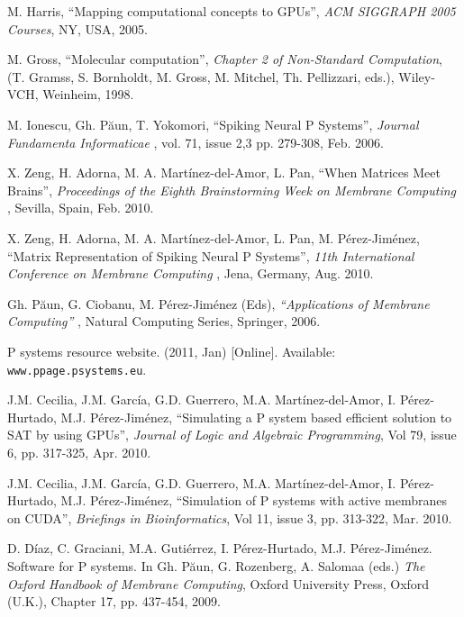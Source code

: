 \documentclass{svmultm}
\begin{document}
\begin{thebibliography}{9999}



 M. Harris, ``Mapping computational concepts to GPUs'', {\it ACM SIGGRAPH 2005 Courses}, NY, USA, 2005.

 M. Gross,  ``Molecular computation'', {\it Chapter 2 of Non-Standard Computation}, (T. Gramss,
S. Bornholdt, M. Gross, M. Mitchel, Th. Pellizzari, eds.), Wiley-VCH, Weinheim, 1998.


 M. Ionescu, Gh. P\u aun, T. Yokomori, ``Spiking Neural P Systems'', {\it Journal Fundamenta Informaticae  }, vol. 71, issue 2,3 pp. 279-308, Feb. 2006.


 X. Zeng, H. Adorna, M. A. Mart\'{i}nez-del-Amor, L. Pan, ``When Matrices Meet Brains'', {\it Proceedings of the Eighth Brainstorming Week on Membrane Computing }, Sevilla, Spain, Feb. 2010.

 X. Zeng, H. Adorna, M. A. Mart\'{i}nez-del-Amor, L. Pan, M. P\'{e}rez-Jim\'{e}nez, ``Matrix Representation of Spiking Neural P Systems'', {\it 11th International Conference on Membrane Computing }, Jena, Germany, Aug. 2010.


 Gh. P\u aun, G. Ciobanu, M. P\'{e}rez-Jim\'{e}nez (Eds), {\it ``Applications of Membrane Computing'' }, Natural Computing Series, Springer, 2006.

 P systems resource website. (2011, Jan) [Online]. Available: {\tt www.ppage.psystems.eu}.



 J.M. Cecilia, J.M. Garc\'{i}a, G.D. Guerrero, M.A. Mart\'{i}nez-del-Amor, I. P\'{e}rez-Hurtado, M.J. P\'{e}rez-Jim\'{e}nez, ``Simulating a P system based efficient solution to SAT by using GPUs'', {\it Journal of Logic and Algebraic Programming}, Vol 79, issue 6, pp. 317-325, Apr. 2010.

 J.M. Cecilia, J.M. Garc\'{i}a, G.D. Guerrero, M.A. Mart\'{i}nez-del-Amor, I. P\'{e}rez-Hurtado, M.J. P\'{e}rez-Jim\'{e}nez, ``Simulation of P systems with active membranes on CUDA'', {\it Briefings in Bioinformatics}, Vol 11, issue 3, pp. 313-322, Mar. 2010.

 D. D\'{i}az, C. Graciani, M.A. Guti\'{e}rrez, I. P\'{e}rez-Hurtado, M.J. P\'{e}rez-Jim\'{e}nez. Software for P systems. In Gh. P\u{a}un, G. Rozenberg, A. Salomaa (eds.) \textit{The Oxford Handbook of Membrane Computing}, Oxford University Press, Oxford (U.K.), Chapter 17, pp. 437-454, 2009.


\end{thebibliography}
\end{document}
